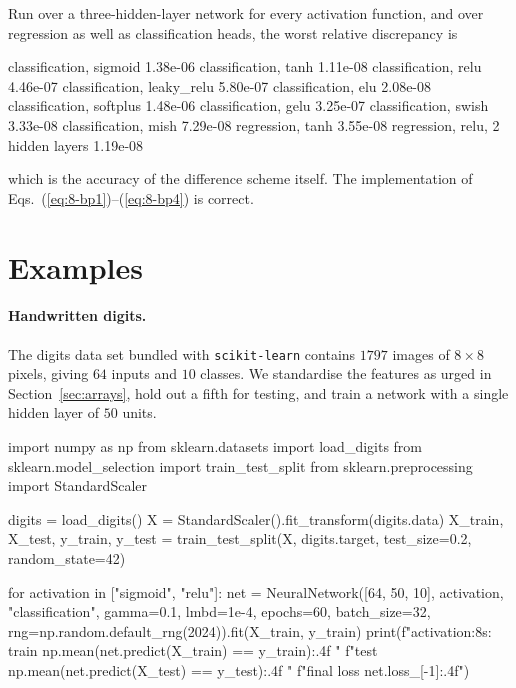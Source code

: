 Run over a three-hidden-layer network for every activation function, and over
regression as well as classification heads, the worst relative discrepancy is

\begin{Python}{}
classification, sigmoid                     1.38e-06
classification, tanh                        1.11e-08
classification, relu                        4.46e-07
classification, leaky_relu                  5.80e-07
classification, elu                         2.08e-08
classification, softplus                    1.48e-06
classification, gelu                        3.25e-07
classification, swish                       3.33e-08
classification, mish                        7.29e-08
regression, tanh                            3.55e-08
regression, relu, 2 hidden layers           1.19e-08
\end{Python}

which is the accuracy of the difference scheme itself.  The implementation of
Eqs.~(\ref{eq:8-bp1})--(\ref{eq:8-bp4}) is correct.

\section{Examples}
\label{sec:nnexamples}

\paragraph{Handwritten digits.}
The digits data set bundled with \texttt{scikit-learn} contains $1797$ images
of $8\times8$ pixels, giving $64$ inputs and $10$ classes.  We standardise the
features as urged in Section~\ref{sec:arrays}, hold out a fifth for testing,
and train a network with a single hidden layer of $50$ units.

\begin{Python}{}
import numpy as np
from sklearn.datasets import load_digits
from sklearn.model_selection import train_test_split
from sklearn.preprocessing import StandardScaler

digits = load_digits()
X = StandardScaler().fit_transform(digits.data)
X_train, X_test, y_train, y_test = train_test_split(X, digits.target,
                                                    test_size=0.2, random_state=42)

for activation in ["sigmoid", "relu"]:
    net = NeuralNetwork([64, 50, 10], activation, "classification",
                        gamma=0.1, lmbd=1e-4, epochs=60, batch_size=32,
                        rng=np.random.default_rng(2024)).fit(X_train, y_train)
    print(f"{activation:8s}: train {np.mean(net.predict(X_train) == y_train):.4f}  "
          f"test {np.mean(net.predict(X_test) == y_test):.4f}  "
          f"final loss {net.loss_[-1]:.4f}")
\end{Python}

